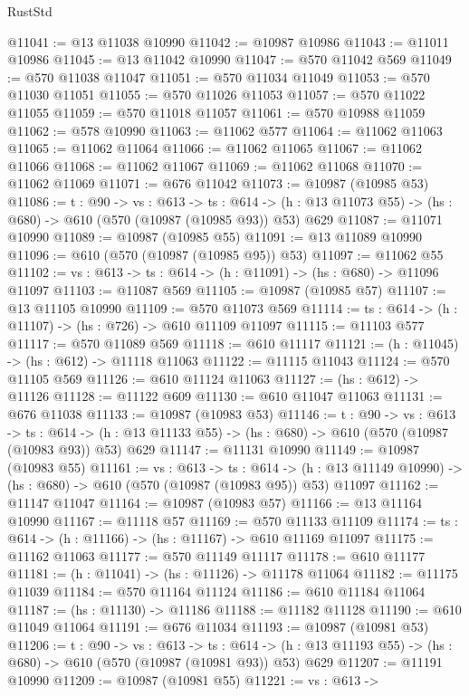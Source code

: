 \begin{lexlean}{RustStd}
\begin{coremodule}
@11041 := @13 @11038 @10990
@11042 := @10987 @10986
@11043 := @11011 @10986
@11045 := @13 @11042 @10990
@11047 := @570 @11042 @569
@11049 := @570 @11038 @11047
@11051 := @570 @11034 @11049
@11053 := @570 @11030 @11051
@11055 := @570 @11026 @11053
@11057 := @570 @11022 @11055
@11059 := @570 @11018 @11057
@11061 := @570 @10988 @11059
@11062 := @578 @10990
@11063 := @11062 @577
@11064 := @11062 @11063
@11065 := @11062 @11064
@11066 := @11062 @11065
@11067 := @11062 @11066
@11068 := @11062 @11067
@11069 := @11062 @11068
@11070 := @11062 @11069
@11071 := @676 @11042
@11073 := @10987 (@10985 @53)
@11086 := {t : @90} ->
  {vs : @613} ->
  {ts : @614} -> (h : @13 @11073 @55) -> (hs : @680) -> @610 (@570 (@10987 (@10985 @93)) @53) @629
@11087 := @11071 @10990
@11089 := @10987 (@10985 @55)
@11091 := @13 @11089 @10990
@11096 := @610 (@570 (@10987 (@10985 @95)) @53)
@11097 := @11062 @55
@11102 := {vs : @613} -> {ts : @614} -> (h : @11091) -> (hs : @680) -> @11096 @11097
@11103 := @11087 @569
@11105 := @10987 (@10985 @57)
@11107 := @13 @11105 @10990
@11109 := @570 @11073 @569
@11114 := {ts : @614} -> (h : @11107) -> (hs : @726) -> @610 @11109 @11097
@11115 := @11103 @577
@11117 := @570 @11089 @569
@11118 := @610 @11117
@11121 := (h : @11045) -> (hs : @612) -> @11118 @11063
@11122 := @11115 @11043
@11124 := @570 @11105 @569
@11126 := @610 @11124 @11063
@11127 := (hs : @612) -> @11126
@11128 := @11122 @609
@11130 := @610 @11047 @11063
@11131 := @676 @11038
@11133 := @10987 (@10983 @53)
@11146 := {t : @90} ->
  {vs : @613} ->
  {ts : @614} -> (h : @13 @11133 @55) -> (hs : @680) -> @610 (@570 (@10987 (@10983 @93)) @53) @629
@11147 := @11131 @10990
@11149 := @10987 (@10983 @55)
@11161 := {vs : @613} ->
  {ts : @614} ->
  (h : @13 @11149 @10990) -> (hs : @680) -> @610 (@570 (@10987 (@10983 @95)) @53) @11097
@11162 := @11147 @11047
@11164 := @10987 (@10983 @57)
@11166 := @13 @11164 @10990
@11167 := @11118 @57
@11169 := @570 @11133 @11109
@11174 := {ts : @614} -> (h : @11166) -> (hs : @11167) -> @610 @11169 @11097
@11175 := @11162 @11063
@11177 := @570 @11149 @11117
@11178 := @610 @11177
@11181 := (h : @11041) -> (hs : @11126) -> @11178 @11064
@11182 := @11175 @11039
@11184 := @570 @11164 @11124
@11186 := @610 @11184 @11064
@11187 := (hs : @11130) -> @11186
@11188 := @11182 @11128
@11190 := @610 @11049 @11064
@11191 := @676 @11034
@11193 := @10987 (@10981 @53)
@11206 := {t : @90} ->
  {vs : @613} ->
  {ts : @614} -> (h : @13 @11193 @55) -> (hs : @680) -> @610 (@570 (@10987 (@10981 @93)) @53) @629
@11207 := @11191 @10990
@11209 := @10987 (@10981 @55)
@11221 := {vs : @613} ->

\end{coremodule}
\end{lexlean}
